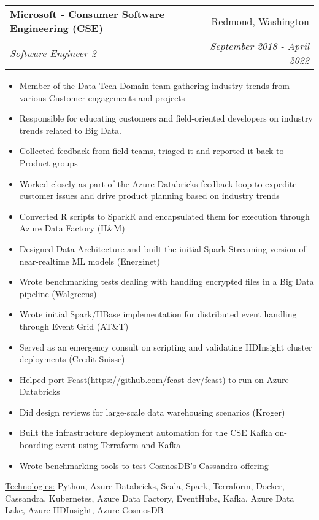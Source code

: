 \documentclass[letterpaper,11pt]{article}
\makeatletter
\newcommand{\sepsection}{\vspace{25pt}}
\newcommand{\resumeItem}[1]{%
  \item\small{
    #1
  }
}
\newcommand{\resumeSubheading}[4]{
  \vspace{8pt}\item%
    \begin{tabular*}{0.97\textwidth}[t]{l@{\extracolsep{\fill}}r}
      \textbf{#1} & #2 \\
      \textit{\small#3} & \textit{\small #4} \\
    \end{tabular*}\vspace{-5pt}
}
\newcommand{\resumeItemListStart}{\begin{itemize}}
\newcommand{\resumeItemListEnd}{\end{itemize}\vspace{-5pt}}
\newcommand{\resumeTech}[2]{
 \underline{#1:} #2
}
\makeatother
\begin{document}
    \sepsection

    \resumeSubheading
      {Microsoft - Consumer Software Engineering (CSE)}{Redmond, Washington}
      {Software Engineer 2}{September 2018 - April 2022}
      \resumeItemListStart
      \resumeItem{Member of the Data Tech Domain team gathering industry trends from various Customer engagements and projects}
      \resumeItem{Responsible for educating customers and field-oriented developers on industry trends related to Big Data.}
      \resumeItem{Collected feedback from field teams, triaged it and reported it back to Product groups}
      \resumeItem{Worked closely as part of the Azure Databricks feedback loop to expedite customer issues and drive product planning based on industry trends}
      \resumeItem{Converted R scripts to SparkR and encapsulated them for execution through Azure Data Factory (H\&M)}
      \resumeItem{Designed Data Architecture and built the initial Spark Streaming version of near-realtime ML models (Energinet)}
      \resumeItem{Wrote benchmarking tests dealing with handling encrypted files in a Big Data pipeline (Walgreens)}
      \resumeItem{Wrote initial Spark/HBase implementation for distributed event handling through Event Grid (AT\&T)}
      \resumeItem{Served as an emergency consult on scripting and validating HDInsight cluster deployments (Credit Suisse)}
      \resumeItem{Helped port \href{https://github.com/feast-dev/feast}{Feast}(https://github.com/feast-dev/feast) to run on Azure Databricks}
      \resumeItem{Did design reviews for large-scale data warehousing scenarios (Kroger)}
      \resumeItem{Built the infrastructure deployment automation for the CSE Kafka on-boarding event using Terraform and Kafka}
      \resumeItem{Wrote benchmarking tools to test CosmosDB's Cassandra offering}
      \resumeItemListEnd
      \resumeTech{Technologies}{Python, Azure Databricks, Scala, Spark, Terraform, Docker, Cassandra, Kubernetes, Azure Data Factory, EventHubs, Kafka, Azure Data Lake, Azure HDInsight, Azure CosmosDB}\\
      
    \sepsection
\end{document}
